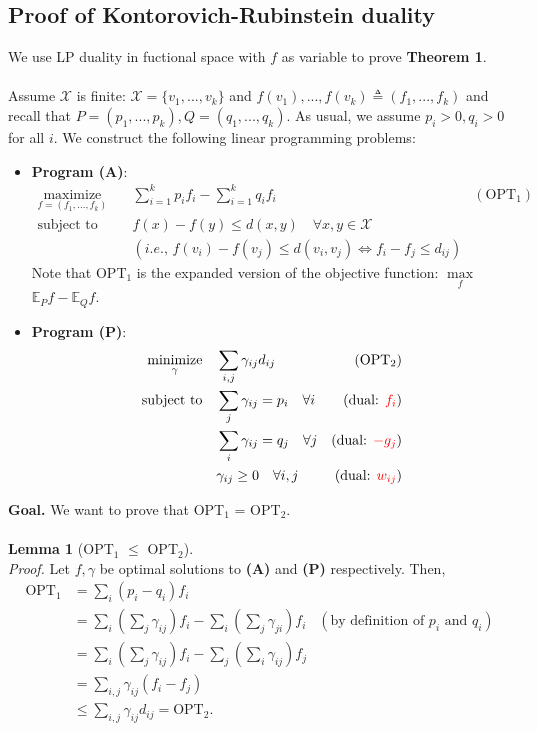 \documentclass[11pt]{article}
\newcommand\bbE{\ensuremath{\mathbb{E}}} %
\newcommand{\1}{\mathbb{I}} %
\begin{document}
\subsection{Proof of Kontorovich-Rubinstein duality}
We use LP duality in fuctional space with $f$ as variable to prove \textbf{Theorem 1}. \\
\\
Assume $\mathcal{X}$ is finite: $\mathcal{X} = \{v_1, ..., v_k\}$ and $f(v_1),...,f(v_k) \triangleq (f_1,...,f_k)$ and recall that $P = (p_1,...,p_k), Q = (q_1,...,q_k)$. As usual, we assume $p_i > 0, q_i > 0$ for all $i$. We construct the following linear programming problems:
\begin{itemize}
    \item \textbf{Program (A)}:
    \begin{align*}
        \mbox{$\underset{f = (f_1,...,f_k)}{\text{maximize}}$} \quad &\sum_{i=1}^k p_if_i - \sum_{i=1}^k q_if_i &\left(\text{OPT}_1\right)\\
        \mbox{subject to} \quad &f(x) - f(y) \le d(x,y) \quad \forall x,y \in \mathcal{X}\\
        &(\text{$i.e.$, } f(v_i) - f(v_j) \le d(v_i, v_j) \Longleftrightarrow f_i - f_j \le d_{ij})
    \end{align*}
    Note that OPT$_1$ is the expanded version of the objective function: $\underset{f}{\max}$ $\bbE_P f - \bbE_Q f$.
    \item \textbf{Program (P)}:
    \begin{align*}
        \mbox{$\underset{\gamma}{\text{minimize}}$} \quad &\sum_{i,j} \gamma_{ij} d_{ij} &\left(\text{OPT}_2\right)\\
        \mbox{subject to} \quad &\sum_j \gamma_{ij} = p_i \quad \forall i &\left(\text{dual: } \textcolor{red}{f_i} \right)\\
        &\sum_i \gamma_{ij} = q_j \quad \forall j &\left(\text{dual: } \textcolor{red}{-g_j} \right)\\
        &\gamma_{ij} \ge 0 \quad \forall i,j &\left(\text{dual: } \textcolor{red}{w_{ij}} \right)
    \end{align*}
\end{itemize}

\noindent \textbf{Goal.} We want to prove that OPT$_1$ = OPT$_2$. \\
\\
\noindent \textbf{Lemma 1} (OPT$_1$ $\le$ OPT$_2$).\\
\textit{Proof.} Let $f, \gamma$ be optimal solutions to \textbf{(A)} and \textbf{(P)} respectively. Then,
\begin{align*}
    \text{OPT}_1 &= \sum_i (p_i - q_i) f_i\\
    &= \sum_i (\sum_j \gamma_{ij}) f_i - \sum_i(\sum_j \gamma_{ji}) f_i &\left(\text{by definition of $p_i$ and $q_i$}\right)\\
    &= \sum_i (\sum_j \gamma_{ij}) f_i - \sum_j(\sum_i \gamma_{ij}) f_j\\
    &= \sum_{i,j} \gamma_{ij}(f_i - f_j) \\
    &\le \sum_{i,j} \gamma_{ij} d_{ij} = \text{OPT}_2.
\end{align*}
\end{document}
